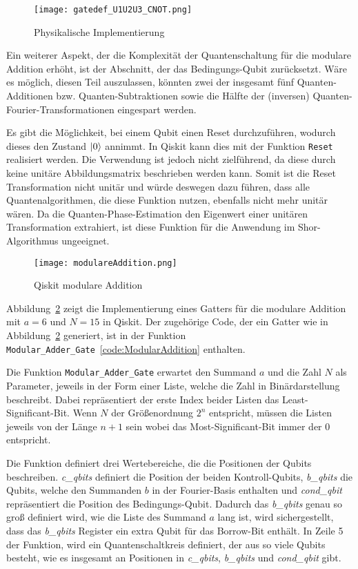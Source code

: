 \begin{figure} [H]
  \caption{Physikalische Implementierung~\cite{ibmqx5}}
  \label{fig:gatedef_U1U2U3_CNOT}
  \texttt{[image: gatedef\_U1U2U3\_CNOT.png]}
  \centering
  \end{figure}

Ein weiterer Aspekt, 
der die Komplexität der Quantenschaltung für die modulare Addition erhöht, 
ist der Abschnitt, der das Bedingungs-Qubit zurücksetzt.
Wäre es möglich, diesen Teil auszulassen, könnten zwei der insgesamt fünf Quanten-Additionen bzw. 
Quanten-Subtraktionen sowie die Hälfte der (inversen) Quanten-Fourier-Transformationen eingespart werden.

Es gibt die Möglichkeit, bei einem Qubit einen Reset durchzuführen, wodurch dieses den Zustand \(\ket{0}\) annimmt.
In Qiskit kann dies mit der Funktion \texttt{Reset}~\cite{qiskitReset} realisiert werden.
Die Verwendung ist jedoch nicht zielführend, da diese durch keine unitäre Abbildungsmatrix
beschrieben werden kann.
Somit ist die Reset Transformation nicht unitär und würde deswegen dazu führen, dass alle Quantenalgorithmen, 
die diese Funktion nutzen, ebenfalls nicht mehr unitär wären.
Da die Quanten-Phase-Estimation den Eigenwert einer unitären Transformation extrahiert, 
ist diese Funktion für die Anwendung im Shor-Algorithmus ungeeignet.

\begin{figure} [H]
  \caption{Qiskit modulare Addition}
  \label{fig:ModularAddition}
  \texttt{[image: modulareAddition.png]}
  \centering
  \end{figure}

Abbildung~\ref{fig:ModularAddition} zeigt die Implementierung eines Gatters für die modulare Addition 
mit \(a = 6\) und \(N = 15\) in Qiskit.
Der zugehörige Code, der ein Gatter wie in Abbildung~\ref{fig:ModularAddition} generiert, 
ist in der Funktion \texttt{Modular\_Adder\_Gate}~\ref{code:ModularAddition} enthalten.

Die Funktion \texttt{Modular\_Adder\_Gate} erwartet den Summand \(a\) und die Zahl \(N\) als Parameter, 
jeweils in der Form einer Liste, 
welche die Zahl in Binärdarstellung beschreibt.
Dabei repräsentiert der erste Index beider Listen das Least-Significant-Bit.
Wenn \(N\) der Größenordnung \(2^n\) entspricht, 
müssen die Listen jeweils von der Länge \(n+1\) sein wobei das Most-Significant-Bit immer der \(0\) entspricht.

Die Funktion definiert drei Wertebereiche, die die Positionen der Qubits beschreiben.
\textit{c\_qbits} definiert die Position der beiden Kontroll-Qubits, 
\textit{b\_qbits} die Qubits, welche den Summanden \(b\) 
in der Fourier-Basis enthalten 
und \textit{cond\_qbit} repräsentiert die Position des Bedingungs-Qubit.
Dadurch das \textit{b\_qbits} genau so groß definiert wird, 
wie die Liste des Summand \(a\) lang ist, wird sichergestellt, 
dass das \textit{b\_qbits} Register ein extra Qubit für das Borrow-Bit enthält.
In Zeile 5 der Funktion, wird ein Quantenschaltkreis definiert, 
der aus so viele Qubits besteht, wie es insgesamt an Positionen in 
\textit{c\_qbits}, \textit{b\_qbits} und \textit{cond\_qbit} gibt.

